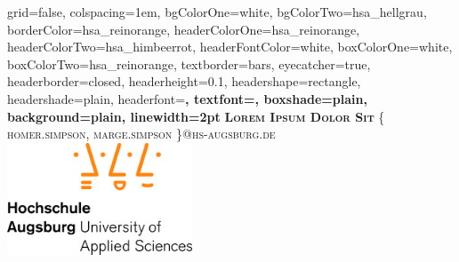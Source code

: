 \documentclass[portrait,final,a0paper,fontscale=0.277]{baposter}
\begin{document}



\begin{poster}%
  {
  grid=false,
  colspacing=1em,
  bgColorOne=white,
  bgColorTwo=hsa_hellgrau,
  borderColor=hsa_reinorange,
  headerColorOne=hsa_reinorange,
  headerColorTwo=hsa_himbeerrot,
  headerFontColor=white,
  boxColorOne=white,
  boxColorTwo=hsa_reinorange,
  textborder=bars,
  eyecatcher=true,
  headerborder=closed,
  headerheight=0.1\textheight,
  headershape=rectangle,
  headershade=plain,
  headerfont=\Large\bf\sc, %
  textfont={\sf\setlength{\parindent}{1.5em}},
  boxshade=plain,
  background=plain,
  linewidth=2pt
  }
  {
  } 
  {\bf\textsc{Lorem Ipsum Dolor Sit}\vspace{0.5em}}
  {\textsc{\{ homer.simpson, marge.simpson \}@hs-augsburg.de}}
  {%
    \includegraphics[height=9.0em]{images/hsa_logo_normal.jpg}
  }	


\end{poster}
\end{document}
